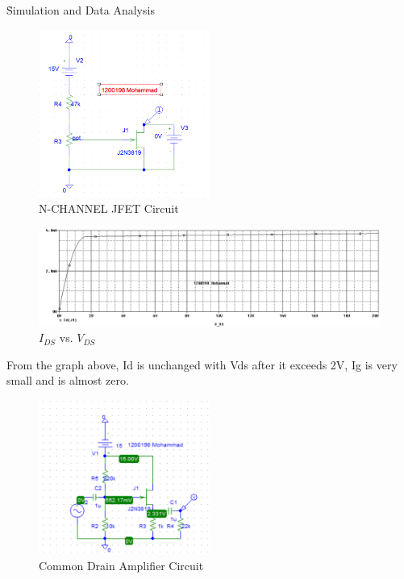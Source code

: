 \documentclass[12pt]{article}
\begin{document}
\h{Simulation and Data Analysis}
\begin{figure}[H]
\centering
    \includegraphics[width=0.5\textwidth]{assets/main/2023-08-18-23-40-04.png}
    \caption{N-CHANNEL JFET Circuit}
\end{figure}
\begin{figure}[H]
    \centering
    \includegraphics[width=\textwidth]{assets/main/2023-08-18-23-43-53.png}
    \caption{$I_{DS}$ vs. $V_{DS}$}
\end{figure}
From the graph above, Id is unchanged with Vds after it exceeds 2V, Ig is very small and is almost zero.
\begin{figure}[H]
    \centering
    \includegraphics[width=0.5\textwidth]{assets/main/2023-08-18-23-52-56.png}
    \caption{Common Drain Amplifier Circuit}
\end{figure}
\end{document}
